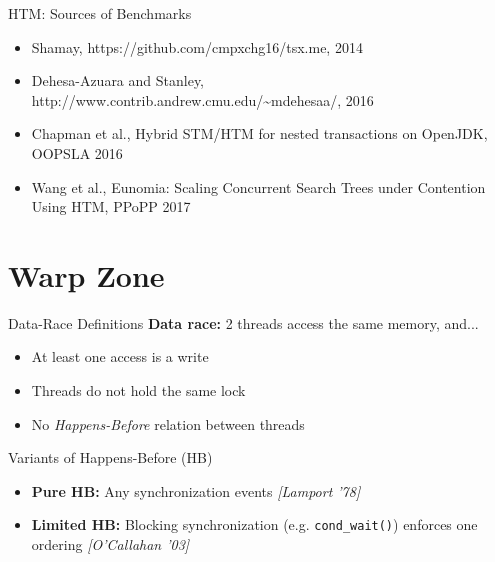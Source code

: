 \documentclass[xcolor=dvipsnames]{beamer}
\begin{document}


\begin{frame}{HTM: Sources of Benchmarks}
	\begin{itemize}
		\item Shamay, https://github.com/cmpxchg16/tsx.me, 2014
		\item Dehesa-Azuara and Stanley, http://www.contrib.andrew.cmu.edu/\textasciitilde{}mdehesaa/, 2016
		\item Chapman et al., Hybrid STM/HTM for nested transactions on OpenJDK, OOPSLA 2016
		\item Wang et al., Eunomia: Scaling Concurrent Search Trees under Contention Using HTM, PPoPP 2017
	\end{itemize}
\end{frame}


\section{Warp Zone}


\begin{frame}{Data-Race Definitions}
	\textbf{Data race:} 2 threads access the same memory, and...
	\begin{itemize}
		\item At least one access is a write
		\item Threads do not hold the same lock
		\item No {\em Happens-Before} relation between threads
	\end{itemize}
	\pause
	\linegap

	Variants of Happens-Before (HB)
	\begin{itemize}
		\item {\bf Pure HB:} Any synchronization events {\em [Lamport '78]}
		\item {\bf Limited HB:} Blocking synchronization (e.g. \texttt{cond\_wait()}) enforces one ordering {\em [O'Callahan '03]}
	\end{itemize}
\end{frame}
\end{document}
